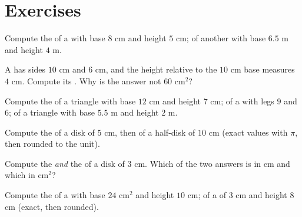 \section{Exercises}

\begin{exercise}[$\star$]\label{exo:g7:areas:1}
Compute the  of a  with base $8$ cm and height
$5$ cm; of another with base $6.5$ m and height $4$ m.
\end{exercise}

\begin{exercise}[$\star$]\label{exo:g7:areas:2}
A  has sides $10$ cm and $6$ cm, and the height relative
to the $10$ cm base measures $4$ cm. Compute its . Why is the
answer not $60$ cm$^2$?
\end{exercise}

\begin{exercise}[$\star$]\label{exo:g7:areas:3}
Compute the  of a triangle with base $12$ cm and height $7$ cm;
of a  with legs $9$ and $6$; of a triangle with base
$5.5$ m and height $2$ m.
\end{exercise}

\begin{exercise}[$\star$]\label{exo:g7:areas:4}
Compute the  of a disk of  $5$ cm, then of a half-disk of
 $10$ cm (exact values with $\pi$, then rounded to the unit).
\end{exercise}

\begin{exercise}[$\star$]\label{exo:g7:areas:5}
Compute the  \emph{and} the  of a disk of  $3$ cm.
Which of the two answers is in cm and which in cm$^2$?
\end{exercise}

\begin{exercise}[$\star$]\label{exo:g7:areas:6}
Compute the  of a  with base  $24$ cm$^2$ and height
$10$ cm; of a  of  $3$ cm and height $8$ cm (exact,
then rounded).
\end{exercise}

